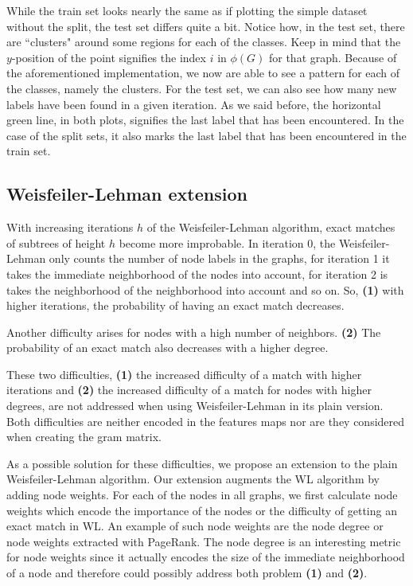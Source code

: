 While the train set looks nearly the same as if plotting the simple dataset without the split, the test set differs quite a bit.
Notice how, in the test set, there are ``clusters" around some regions for each of the classes. 
Keep in mind that the $y$-position of the point signifies the index $i$ in $\phi(G)$ for that graph.
Because of the aforementioned implementation, we now are able to see a pattern for each of the classes, namely the clusters.
For the test set, we can also see how many new labels have been found in a given iteration.
As we said before, the horizontal green line, in both plots, signifies the last label that has been encountered.
In the case of the split sets, it also marks the last label that has been encountered in the train set.


\subsection{Weisfeiler-Lehman extension}
With increasing iterations $h$ of the Weisfeiler-Lehman algorithm, exact matches of subtrees of height $h$ become more improbable.
In iteration 0, the Weisfeiler-Lehman only counts the number of node labels in the graphs, for iteration 1 it takes the immediate neighborhood of the nodes into account, for iteration 2 is takes the neighborhood of the neighborhood into account and so on.
So, \textbf{(1)} with higher iterations, the probability of having an exact match decreases.

Another difficulty arises for nodes with a high number of neighbors. \textbf{(2)} The probability of an exact match also decreases with a higher degree.

These two difficulties, \textbf{(1)} the increased difficulty of a match with higher iterations and \textbf{(2)} the increased difficulty of a match for nodes with higher degrees, are not addressed when using Weisfeiler-Lehman in its plain version. Both difficulties are neither encoded in the features maps nor are they considered when creating the gram matrix.

As a possible solution for these difficulties, we propose an extension to the plain Weisfeiler-Lehman algorithm.
Our extension augments the WL algorithm by adding node weights.
For each of the nodes in all graphs, we first calculate node weights which encode the importance of the nodes or the difficulty of getting an exact match in WL.
An example of such node weights are the node degree or node weights extracted with PageRank.
The node degree is an interesting metric for node weights since it actually encodes the size of the immediate neighborhood of a node and therefore could possibly address both problem \textbf{(1)} and \textbf{(2)}.

